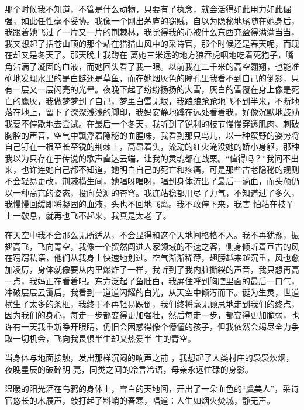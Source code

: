 \documentclass{article}
\begin{document}
那个时候我不知道，不管是什么动物，只要有了执念，就会活得如此用力如此倔强，如此任性毫不妥协。我像一个刚出茅庐的窃贼，自以为隐秘地尾随在她身后，我跟着她飞过了一片又一片的荆棘林，我觉得我的心被什么东西充盈得满满当当，我又想起了括苍山顶的那个站在猎猎山风中的采诗官，那个时候还是春天呢，而现在却又是冬天了。那天晚上我蹲在
\newpage
离她三米远的地方狼吞虎咽地吃着死狍子，嘴角沾满了凝固的血液，而她回头看了我一眼。以前我在二千米的高空翱翔，也能准确地发现水里的是白鲢还是草鱼，而在她烟灰色的瞳孔里我看不到自己的倒影，只有一层又一层闪亮的光晕。夜晚下起了纷纷扬扬的大雪，灰白的雪覆在身上像是死亡的鹰灰，我做梦梦到了自己，梦里白雪无垠，我踉踉跄跄地飞不到半米，不断地落在地上，留下了深深浅浅的脚印，我妈安静地蹲在远处看着我，好像沉默地鼓励我要不停歇地去尝试。在最后一个冬天，我听到了锐利的枝节慢慢穿透肌肉、刺破胸腔的声音，空气中飘浮着隐秘的血腥味，我看到那只鸟儿，以一种蛮野的姿势将自己钉在一根至长至锐的荆棘上，高昂着头，流动的红火淹没她的娇小身躯，那种我以为只存在于传说的歌声直达云端，让我的灵魂都在战栗。“值得吗？”我问不出来，也许连她自己都不知道，她明白自己的死亡和疼痛，可是那些古老隐秘的规则不会轻易更改，荆棘横生间，她唱呀唱呀，唱到身体流出了最后一滴血，而头颅仍以一种高亢的姿态，投向莫测的苍穹。我连站稳都用尽了力气，不知道过了多久，我慢慢回缓即将凝固的血液，头也不回地飞离。我不敢停下来，我害
\newpage
怕站在枝丫上一歇息，就再也飞不起来，我真是太老
了。 

在天空中我不会那么无所适从，不会显得和这个天地间格格不入。我不再犹豫，振翅高飞，飞向青空，我像一个贸然闯进人家领域的不速之客，侧身倾听着亘古的风在窃窃私语，他们从我身上快速地划过。空气渐渐稀薄，翅膀越来越沉重，风也愈加凌厉，身体就像要从内里爆炸了一样，我听到了我内脏撕裂的声音，我只想再高一点，我妈正在看着吧。东方泛起了鱼肚白，我屏住呼到胸腔里面的最后一口气，冲破层层云霭后，我看到一道道闪耀的白光，从天空中倾泻而下。诞为生灵，世道横生了太多的条框，我终于不再轻易跌倒，我们终将毫无顾忌地走到我们的终点，因为我们的身心，每走一步都变得更加强壮，然后每走一步，都变得更加脆弱，也许有一天我重新睁开眼睛，仍旧会困惑得像个懵懂的孩子，但我依然会竭尽全力争取一切机会，飞向我畏惧半生却又热爱半
生的青空。 

当身体与地面接触，发出那样沉闷的响声之前
\newpage
，我想起了人类村庄的袅袅炊烟，夜晚星辰的破碎明
亮，同类之间的冷言冷语，母亲永远忙碌的身影。 

温暖的阳光洒在乌鸦的身体上，雪白的天地间，开出了一朵血色的“虞美人”，采诗官悠长的木屐声，敲打起了料峭的春寒，唱道：人生如烟火焚城，静无声。
\end{document}
